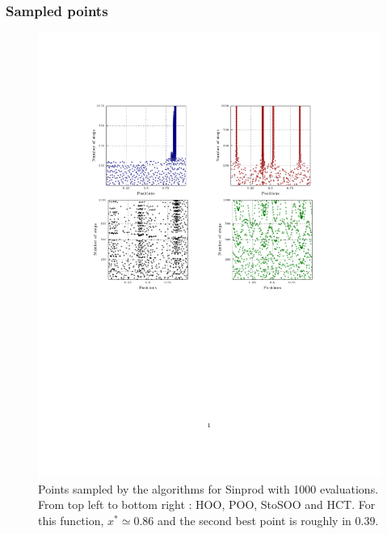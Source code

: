 \documentclass[xcolor={usenames,dvipsnames}]{beamer}
\begin{document}
\begin{frame}
\frametitle{Sampled points}
\begin{figure}
\vspace{-0.75cm}
\includegraphics[trim = {0 6cm 0 4cm},clip,scale = 0.5]{marginal1000.pdf}
\vspace{-2.25cm}
  \caption{\label{fig:position1000}Points sampled by the algorithms for Sinprod with 1000 evaluations. From top left to bottom right : HOO, POO, StoSOO and HCT. For this function, $x^*\simeq 0.86$ and the second best point is roughly in $0.39$.}
\end{figure}
\end{frame}
\end{document}
